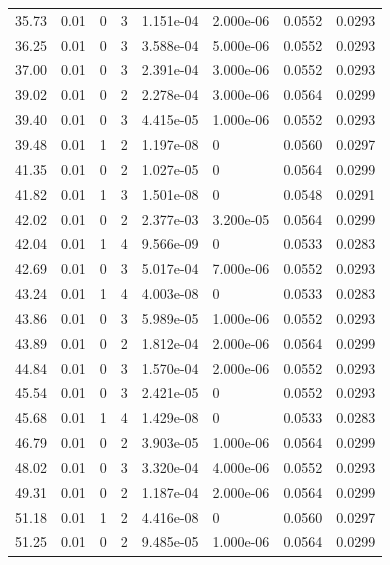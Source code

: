 \documentclass[preview]{standalone}
\begin{document}
{{{\begin{tabular}{L{1.2cm}C{1.2cm} C{0.3cm}C{0.5cm} C{1.4cm}C{1.4cm} C{1.4cm}C{1.4cm}}
  35.73  &  0.01  & 0     &  3 &  1.151e-04  & 2.000e-06  & 0.0552 &  0.0293   \\ 
  36.25  &  0.01  & 0     &  3 &  3.588e-04  & 5.000e-06  & 0.0552 &  0.0293   \\ 
  37.00  &  0.01  & 0     &  3 &  2.391e-04  & 3.000e-06  & 0.0552 &  0.0293   \\ 
  39.02  &  0.01  & 0     &  2 &  2.278e-04  & 3.000e-06  & 0.0564 &  0.0299   \\ 
  39.40  &  0.01  & 0     &  3 &  4.415e-05  & 1.000e-06  & 0.0552 &  0.0293   \\ 
  39.48  &  0.01  & 1     &  2 &  1.197e-08  & 0  & 0.0560 &  0.0297   \\ 
  41.35  &  0.01  & 0     &  2 &  1.027e-05  & 0  & 0.0564 &  0.0299   \\ 
  41.82  &  0.01  & 1     &  3 &  1.501e-08  & 0  & 0.0548 &  0.0291   \\ 
  42.02  &  0.01  & 0     &  2 &  2.377e-03  & 3.200e-05  & 0.0564 &  0.0299   \\ 
  42.04  &  0.01  & 1     &  4 &  9.566e-09  & 0  & 0.0533 &  0.0283   \\ 
  42.69  &  0.01  & 0     &  3 &  5.017e-04  & 7.000e-06  & 0.0552 &  0.0293   \\ 
  43.24  &  0.01  & 1     &  4 &  4.003e-08  & 0  & 0.0533 &  0.0283   \\ 
  43.86  &  0.01  & 0     &  3 &  5.989e-05  & 1.000e-06  & 0.0552 &  0.0293   \\ 
  43.89  &  0.01  & 0     &  2 &  1.812e-04  & 2.000e-06  & 0.0564 &  0.0299   \\ 
  44.84  &  0.01  & 0     &  3 &  1.570e-04  & 2.000e-06  & 0.0552 &  0.0293   \\ 
  45.54  &  0.01  & 0     &  3 &  2.421e-05  & 0  & 0.0552 &  0.0293   \\ 
  45.68  &  0.01  & 1     &  4 &  1.429e-08  & 0  & 0.0533 &  0.0283   \\ 
  46.79  &  0.01  & 0     &  2 &  3.903e-05  & 1.000e-06  & 0.0564 &  0.0299   \\ 
  48.02  &  0.01  & 0     &  3 &  3.320e-04  & 4.000e-06  & 0.0552 &  0.0293   \\ 
  49.31  &  0.01  & 0     &  2 &  1.187e-04  & 2.000e-06  & 0.0564 &  0.0299   \\ 
  51.18  &  0.01  & 1     &  2 &  4.416e-08  & 0  & 0.0560 &  0.0297   \\ 
  51.25  &  0.01  & 0     &  2 &  9.485e-05  & 1.000e-06  & 0.0564 &  0.0299   \\ 

\end{tabular}}}}
\end{document}
